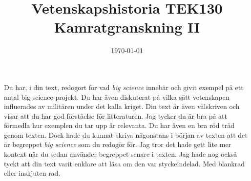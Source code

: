 \documentclass[a4paper, 11pt]{article}
\title{Vetenskapshistoria TEK130\\ Kamratgranskning II}
\author{}
\date{\today}
\begin{document}
\maketitle

Du har, i din text, redogort för vad \emph{big science} innebär och givit exempel på ett antal big science-projekt. Du har även diskuterat på vilka sätt vetenskapen influerades av militären under det kalla kriget. Din text är även välskriven och visar att du har god förståelse för litteraturen. Jag tycker du är bra på att förmedla hur exemplen du tar upp är relevanta. Du har även en bra röd tråd genom texten. Dock hade du kunnat skriva någonstans i början av texten att det är begreppet \emph{big science} som du redogör för. Jag tror det hade gett lite mer kontext när du sedan använder begreppet senare i texten. Jag hade nog också tyckt att din text varit enklare att läsa om den var styckeindelad. Med blankrad eller inskjuten rad.
\end{document}
